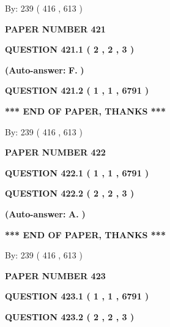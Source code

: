 \documentclass[12pt]{article}
\begin{document}
   
\hspace{1.0in} By: 
 239 ( 416 ,  613 )
   
   
   
   
\newpage 
\setcounter{page}{ 
   421001 } 
   
   
 {\textbf{ \Large{ PAPER NUMBER  421  }}}
   
   
   
   
  
  
{\textbf{\large{QUESTION
421.1 
 ( 2 , 2 , 3 )
}}}
 
 
{\textbf{(Auto-answer:}}
{\textbf{\large{
F.}}}
{\textbf{)}}
 
 
  
  
{\textbf{\large{QUESTION
421.2 
 ( 1 , 1 , 6791 )
}}}
   
   
   
   
\vspace{1.0in} 
{\textbf{\large{ *** END OF PAPER, THANKS *** }}} 
   
   
\hspace{1.0in} By: 
 239 ( 416 ,  613 )
   
   
   
   
\newpage 
\setcounter{page}{ 
   422001 } 
   
   
 {\textbf{ \Large{ PAPER NUMBER  422  }}}
   
   
   
   
  
  
{\textbf{\large{QUESTION
422.1 
 ( 1 , 1 , 6791 )
}}}
  
  
{\textbf{\large{QUESTION
422.2 
 ( 2 , 2 , 3 )
}}}
 
 
{\textbf{(Auto-answer:}}
{\textbf{\large{
A.}}}
{\textbf{)}}
 
 
   
   
   
   
\vspace{1.0in} 
{\textbf{\large{ *** END OF PAPER, THANKS *** }}} 
   
   
\hspace{1.0in} By: 
 239 ( 416 ,  613 )
   
   
   
   
\newpage 
\setcounter{page}{ 
   423001 } 
   
   
 {\textbf{ \Large{ PAPER NUMBER  423  }}}
   
   
   
   
  
  
{\textbf{\large{QUESTION
423.1 
 ( 1 , 1 , 6791 )
}}}
  
  
{\textbf{\large{QUESTION
423.2 
 ( 2 , 2 , 3 )
}}}
 
\end{document}

